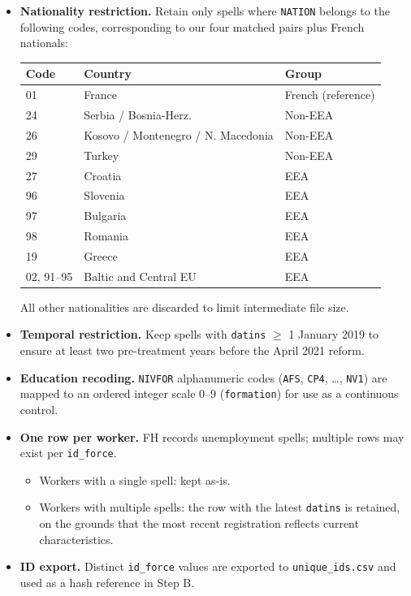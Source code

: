 \begin{itemize}
  \item \textbf{Nationality restriction.} Retain only spells where \texttt{NATION}
  belongs to the following codes, corresponding to our four matched pairs plus French nationals:
  \begin{center}
  \small
  \begin{tabular}{lll}
  \toprule
  Code & Country & Group \\
  \midrule
  01 & France & French (reference) \\
  24 & Serbia / Bosnia-Herz. & Non-EEA \\
  26 & Kosovo / Montenegro / N. Macedonia & Non-EEA \\
  29 & Turkey & Non-EEA \\
  27 & Croatia & EEA \\
  96 & Slovenia & EEA \\
  97 & Bulgaria & EEA \\
  98 & Romania & EEA \\
  19 & Greece & EEA \\
  02, 91--95 & Baltic and Central EU & EEA \\
  \bottomrule
  \end{tabular}
  \end{center}
  All other nationalities are discarded to limit intermediate file size.

  \item \textbf{Temporal restriction.} Keep spells with \texttt{datins} $\geq$
  1 January 2019 to ensure at least two pre-treatment years before the April 2021 reform.

  \item \textbf{Education recoding.} \texttt{NIVFOR} alphanumeric codes
  (\texttt{AFS}, \texttt{CP4}, \ldots, \texttt{NV1}) are mapped to an ordered
  integer scale 0--9 (\texttt{formation}) for use as a continuous control.

  \item \textbf{One row per worker.} FH records unemployment spells; multiple
  rows may exist per \texttt{id\_force}.
  \begin{itemize}
    \item Workers with a single spell: kept as-is.
    \item Workers with multiple spells: the row with the latest \texttt{datins}
    is retained, on the grounds that the most recent registration reflects
    current characteristics.
  \end{itemize}

  \item \textbf{ID export.} Distinct \texttt{id\_force} values are exported to
  \texttt{unique\_ids.csv} and used as a hash reference in Step B.
\end{itemize}


